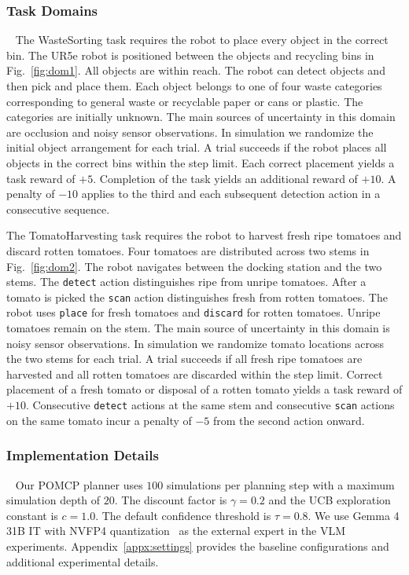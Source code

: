 \subsubsection{Task Domains}~\label{exp:setup_domains}
The WasteSorting task requires the robot to place every object in the correct bin. The UR5e robot is positioned between the objects and recycling bins in Fig.~\ref{fig:dom1}. All objects are within reach. The robot can detect objects and then pick and place them. Each object belongs to one of four waste categories corresponding to general waste or recyclable paper or cans or plastic. The categories are initially unknown. The main sources of uncertainty in this domain are occlusion and noisy sensor observations. In simulation we randomize the initial object arrangement for each trial. A trial succeeds if the robot places all objects in the correct bins within the step limit. Each correct placement yields a task reward of $+5$. Completion of the task yields an additional reward of $+10$. A penalty of $-10$ applies to the third and each subsequent detection action in a consecutive sequence.

The TomatoHarvesting task requires the robot to harvest fresh ripe tomatoes and discard rotten tomatoes. Four tomatoes are distributed across two stems in Fig.~\ref{fig:dom2}. The robot navigates between the docking station and the two stems. The \texttt{detect} action distinguishes ripe from unripe tomatoes. After a tomato is picked the \texttt{scan} action distinguishes fresh from rotten tomatoes. The robot uses \texttt{place} for fresh tomatoes and \texttt{discard} for rotten tomatoes. Unripe tomatoes remain on the stem. The main source of uncertainty in this domain is noisy sensor observations. In simulation we randomize tomato locations across the two stems for each trial. A trial succeeds if all fresh ripe tomatoes are harvested and all rotten tomatoes are discarded within the step limit. Correct placement of a fresh tomato or disposal of a rotten tomato yields a task reward of $+10$. Consecutive \texttt{detect} actions at the same stem and consecutive \texttt{scan} actions on the same tomato incur a penalty of $-5$ from the second action onward.


\subsubsection{Implementation Details}~\label{exp:details}
Our POMCP planner uses $100$ simulations per planning step with a maximum simulation depth of $20$. The discount factor is $\gamma=0.2$ and the UCB exploration constant is $c=1.0$. The default confidence threshold is $\tau=0.8$. We use Gemma 4 31B IT with NVFP4 quantization~\cite{gemmateam2026gemma4} as the external expert in the VLM experiments. Appendix~\ref{appx:settings} provides the baseline configurations and additional experimental details.

